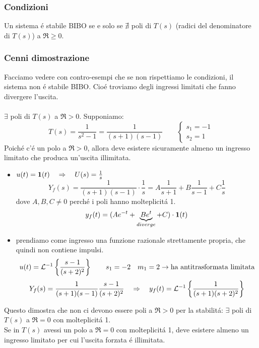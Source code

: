 \documentclass[../main.tex]{subfiles}
\begin{document}
	\subsubsection{Condizioni}
		Un sistema \'{e} stabile BIBO se e solo se $ \nexists $ poli di $ T(s) $ (radici del denominatore di $ T(s) $) a $ \Re \geq 0 $.
	
	\subsubsection{Cenni dimostrazione}
		Facciamo vedere con contro-esempi che se non rispettiamo le condizioni, il sistema non \'{e} stabile BIBO. Cio\'{e} troviamo degli ingressi limitati che fanno divergere l'uscita.\\
		\smallskip\\
		$ \exists $ poli di $ T(s) $ a $ \Re > 0 $. Supponiamo: 
		\[
			T(s) = \frac{1}{s^2-1} = \frac{1}{(s+1)(s-1)} \qquad
			\begin{cases}
				s_1 = -1
				\\
				s_2 = 1
			\end{cases}
		\]
		Poich\'{e} c'\'{e} un polo a $ \Re > 0 $, allora deve esistere sicuramente almeno un ingresso limitato che produca un'uscita illimitata.
		\begin{itemize}
			\item 
				$ u(t) = \textbf{1}(t) \quad \Rightarrow \quad U(s) = \frac{1}{s} $
				\[
					Y_f(s) = \frac{1}{(s+1)(s-1)} \cdot \frac{1}{s} = A\frac{1}{s+1}  + B\frac{1}{s-1} + C\frac{1}{s}
				\]
				dove $ A, B, C \neq 0 $ perch\'{e} i poli hanno molteplicit\'{a} 1.
				\[
					y_f(t) = (Ae^{-t} + \underbrace{Be^t}_{diverge} + C) \cdot \textbf{1}(t)
				\]
			\item
				prendiamo come ingresso una funzione razionale strettamente propria, che quindi non contiene impulsi.
				\[
					u(t) = \mathcal{L}^{-1} \left\lbrace \frac{s-1}{(s+2)^2} \right\rbrace \qquad s_1=-2 \quad m_1=2 \rightarrow \text{ha antitrasformata limitata}
				\]
				\[
					Y_f(s) = \frac{1}{(s+1)(s-1)} \frac{s-1}{(s+2)^2} \quad \Rightarrow \quad y_f(t) = \mathcal{L}^{-1} \left\lbrace \frac{1}{(s+1)(s+2)^2} \right\rbrace
				\]		
		\end{itemize}
		Questo dimostra che non ci devono essere poli a $ \Re > 0 $ per la stabilit\'{a}: $ \exists $ poli di $ T(s) $ a $ \Re = 0 $ con molteplicit\'{a} 1.\\
		\linebreak
		Se in $ T(s) $ avessi un polo a $ \Re = 0 $ con molteplicit\'{a} 1, deve esistere almeno un ingresso limitato per cui l'uscita forzata \'{e} illimitata.
\end{document}
